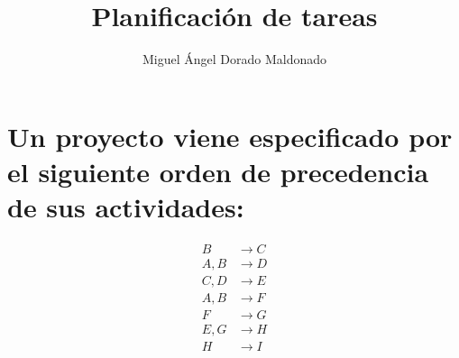 \documentclass{llncs}
\begin{document}
\title{Planificación de tareas}

\author{Miguel Ángel Dorado Maldonado}

\maketitle 

\vspace{1cm} 

\section{Un proyecto viene especificado por el siguiente orden de precedencia de sus actividades:}

\begin{align*}
B &\longrightarrow C \\
A, B &\longrightarrow D \\
C, D &\longrightarrow E \\
A, B &\longrightarrow F \\
F &\longrightarrow G \\
E, G &\longrightarrow H \\
H &\longrightarrow I \\
\end{align*}
\end{document}
